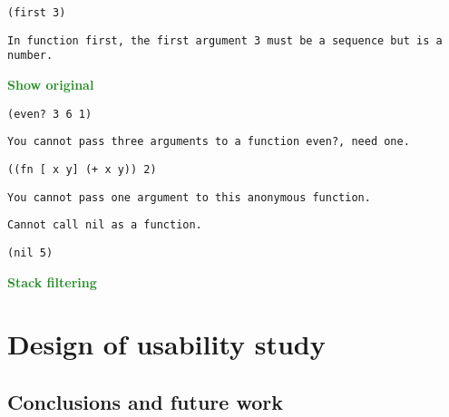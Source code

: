 \documentclass[submission,copyright,creativecommons]{eptcs}
\newcommand{\allcomments}[1]{{#1}}
\newcommand{\emcomment}[1]{{\bf \textcolor{ForestGreen}{\allcomments{{#1}}}}}
\begin{document}
{\tt (first 3)}

\begin{verbatim}
In function first, the first argument 3 must be a sequence but is a number.
\end{verbatim}

\emcomment{Show original}

{\tt (even? 3 6 1)}

\begin{verbatim}
You cannot pass three arguments to a function even?, need one.
\end{verbatim}

{\tt ((fn [ x y] (+ x y)) 2)}

\begin{verbatim}
You cannot pass one argument to this anonymous function.
\end{verbatim}

\begin{verbatim}
Cannot call nil as a function.
\end{verbatim}

{\tt (nil 5)}

\emcomment{Stack filtering}

\section{Design of usability study}\label{sec:study}

\subsection{Conclusions and future work}\label{sec:future}



\end{document}
